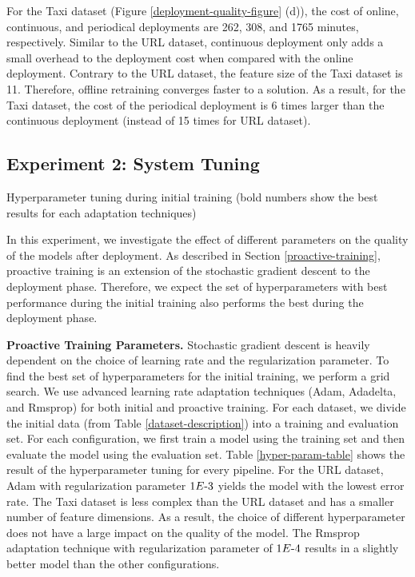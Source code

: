 For the Taxi dataset (Figure \ref{deployment-quality-figure} (d)), the cost of online, continuous, and periodical deployments are 262, 308, and 1765 minutes, respectively.
Similar to the URL dataset, continuous deployment only adds a small overhead to the deployment cost when compared with the online deployment.
Contrary to the URL dataset, the feature size of the Taxi dataset is 11.
Therefore, offline retraining converges faster to a solution.
As a result, for the Taxi dataset, the cost of the periodical deployment is 6 times larger than the continuous deployment (instead of 15 times for URL dataset). 

\subsection{Experiment 2: System Tuning}
\begin{table*}[t]
\centering
\begin{adjustbox}{max width=\textwidth}

\end{adjustbox}
\caption{Hyperparameter tuning during initial training (bold numbers show the best results for each adaptation techniques)}
\label{hyper-param-table}
\end{table*}
In this experiment, we investigate the effect of different parameters on the quality of the models after deployment.
As described in Section \ref{proactive-training}, proactive training is an extension of the stochastic gradient descent to the deployment phase.
Therefore, we expect the set of hyperparameters with best performance during the initial training also performs the best during the deployment phase.

\textbf{Proactive Training Parameters. }
Stochastic gradient descent is heavily dependent on the choice of learning rate and the regularization parameter.
To find the best set of hyperparameters for the initial training, we perform a grid search.
We use advanced learning rate adaptation techniques (Adam, Adadelta, and Rmsprop) for both initial and proactive training.
For each dataset, we divide the initial data (from Table \ref{dataset-description}) into a training and evaluation set.
For each configuration, we first train a model using the training set and then evaluate the model using the evaluation set.
Table \ref{hyper-param-table} shows the result of the hyperparameter tuning for every pipeline.
For the URL dataset, Adam with regularization parameter $1E{\text -}3$ yields the model with the lowest error rate.
The Taxi dataset is less complex than the URL dataset and has a smaller number of feature dimensions.
As a result, the choice of different hyperparameter does not have a large impact on the quality of the model.
The Rmsprop adaptation technique with regularization parameter of $1E{\text -}4$ results in a slightly better model than the other configurations.

